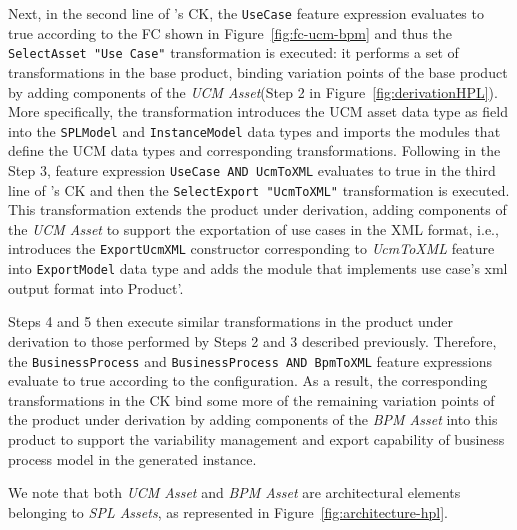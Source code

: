 Next, in the second line of \hpl's CK, the \texttt{UseCase} feature expression evaluates to true according to the FC shown in Figure~\ref{fig:fc-ucm-bpm} and thus the \texttt{SelectAsset "Use Case"} transformation is executed: it performs a set of transformations in the base product, binding variation points of the base product by adding components of the \textit{UCM Asset}(Step 2 in Figure~\ref{fig:derivationHPL}).
More specifically, the transformation introduces the UCM asset data type as field into the \texttt{SPLModel} and \texttt{InstanceModel} data
types and imports the modules that define the UCM data types and corresponding transformations.
Following in the Step 3, feature expression \texttt{UseCase AND UcmToXML} evaluates to true in the third line of \hpl's CK and then the
\texttt{SelectExport "UcmToXML"} transformation is executed. This transformation extends the product under derivation, adding components of the \textit{UCM Asset} to support the exportation of use cases in the XML format, i.e., introduces the \texttt{ExportUcmXML} constructor corresponding to \textit{UcmToXML} feature into \texttt{ExportModel} data type and adds the module that implements use case's xml output format into Product'.

Steps 4 and 5 then execute similar transformations in the product under derivation to those performed by Steps 2 and 3 described previously.
Therefore, the \texttt{BusinessProcess} and \texttt{BusinessProcess AND BpmToXML} feature expressions evaluate to true according to the configuration. As a result, the corresponding transformations in the CK bind some more of the remaining variation points of the product under derivation  by adding  components of the \textit{BPM Asset} into this product to support the variability management and export capability of business process model in the generated \hpl{} instance.

We note that both \textit{UCM Asset} and \textit{BPM Asset} are architectural elements belonging to \textit{SPL Assets}, as represented in Figure~\ref{fig:architecture-hpl}.


